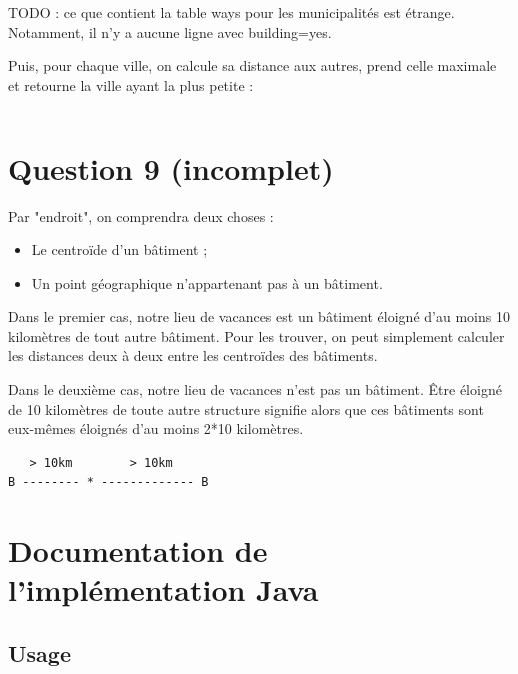 \documentclass[12pt,a4paper]{article}
\begin{document}
TODO : ce que contient la table ways pour les municipalités est étrange. Notamment,
il n'y a aucune ligne avec building=yes.

Puis, pour chaque ville, on calcule sa distance aux autres, prend celle maximale
et retourne la ville ayant la plus petite :

\begin{lstlisting}[language=SQL]
\end{lstlisting}

\vspace{1cm}
\section*{Question 9 (incomplet)}

Par "endroit", on comprendra deux choses :

\begin{itemize}
	\item Le centroïde d'un bâtiment ;
	\item Un point géographique n'appartenant pas à un bâtiment.
\end{itemize}

Dans le premier cas, notre lieu de vacances est un bâtiment éloigné d'au moins
10 kilomètres de tout autre bâtiment. Pour les trouver, on peut simplement
calculer les distances deux à deux entre les centroïdes des bâtiments.

Dans le deuxième cas, notre lieu de vacances n'est pas un bâtiment. Être éloigné
de 10 kilomètres de toute autre structure signifie alors que ces bâtiments sont
eux-mêmes éloignés d'au moins 2*10 kilomètres.

\begin{lstlisting}
   > 10km        > 10km
B -------- * ------------- B
\end{lstlisting}

\vspace{1cm}
\section*{Documentation de l'implémentation Java}

\subsection*{Usage}
\end{document}
